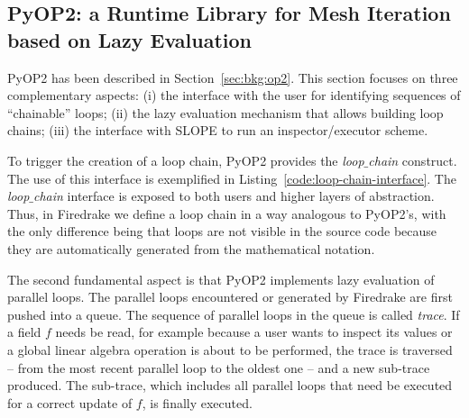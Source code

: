 \subsection{PyOP2: a Runtime Library for Mesh Iteration based on Lazy Evaluation}
PyOP2 has been described in Section~\ref{sec:bkg:op2}. This section focuses on three complementary aspects: (i) the interface with the user for identifying sequences of ``chainable'' loops; (ii) the lazy evaluation mechanism that allows building loop chains; (iii) the interface with SLOPE to run an inspector/executor scheme.

To trigger the creation of a loop chain, PyOP2 provides the {\em loop$\_$chain} construct. The use of this interface is exemplified in Listing~\ref{code:loop-chain-interface}. The {\em loop$\_$chain} interface is exposed to both users and higher layers of abstraction. Thus, in Firedrake we define a loop chain in a way analogous to PyOP2's, with the only difference being that loops are not visible in the source code because they are automatically generated from the mathematical notation.

The second fundamental aspect is that PyOP2 implements lazy evaluation of parallel loops. The parallel loops encountered or generated by Firedrake are first pushed into a queue. The sequence of parallel loops in the queue is called {\em trace}. If a field $f$ needs be read, for example because a user wants to inspect its values or a global linear algebra operation is about to be performed, the trace is traversed -- from the most recent parallel loop to the oldest one -- and a new sub-trace produced. The sub-trace, which includes all parallel loops that need be executed for a correct update of $f$, is finally executed. 

